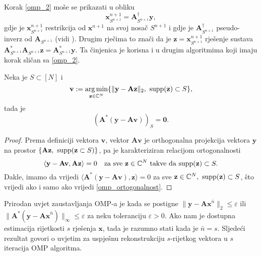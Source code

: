 \documentclass[a4paper,twoside,12pt]{memoir} %
\newcommand{\vect}[1]{\mathbf{#1}}
\renewcommand{\vec}{\vect}
\newcommand{\supp}{\text{\normalfont{supp}}}
\newcommand{\norm}[1]{\|{#1}\|}
\DeclareMathOperator*{\argmin}{arg\,min}
\begin{document}
Korak \eqref{omp_2} mo\v{s}e se prikazati u obliku
\begin{equation*}
    \vec{x}_{S^{n+1}}^{n+1} = \vec{A}_{S^{n+1}}^{\dagger}\vec y,
\end{equation*}
gdje je $\vec{x}_{S^{n+1}}^{n+1}$ restrikcija od $\vec x^{n+1}$ na svoj nosa\v{c} $S^{n+1}$ i gdje je $\vec A^{\dagger}_{S^{n+1}}$ pseudo-inverz od $\vec{A}_{S^{n+1}}$ (vidi \cite{penrose_1955}). Drugim rje\v{c}ima to zna\v{c}i da je $\vec z = \vec x ^{n+1}_{S^{n+1}}$ rje\v{s}enje sustava $\vec A^*_{S^{n+1}} \vec A_{S^{n+1}} \vec z = \vec A^*_{S^{n+1}} \vec y$. Ta \v{c}injenica je korisna i u drugim algoritmima koji imaju korak sli\v{c}an sa \eqref{omp_2}.
\begin{lem}\label{lem:3:4}
    Neka je $S \subset [N]$ i
    \begin{equation*}
        \vec v := \argmin_{\vec z \in \C^N} \{\norm{\vec y - \vec{Az}}_2,\ \supp(\vec z) \subset S\},
    \end{equation*}
    tada je
    \begin{equation}\label{omp_ortogonalnost}
        (\vec A^*(\vec y - \vec{Av}))_S = \vec 0.
    \end{equation}
\end{lem}
\begin{proof}
    Prema definiciji vektora $\vec v$, vektor $\vec{Av}$ je orthogonalna projekcija vektora $\vec y$ na prostor $\{\vec{Az},\ \supp(\vec{z} \subset S)\}$, pa je karakteriziran relacijom ortogonalnosti
    \begin{equation*}
        \langle \vec y - \vec{Av}, \vec{Az} \rangle = 0 \quad \text{za sve }\vec z \in \C^N \ \text{takve da } \supp(\vec z) \subset S.
    \end{equation*}
    Dakle, imamo da vrijedi $\langle \vec A^*( \vec y - \vec{Av}), \vec{z} \rangle = 0$ za sve $\vec z \in \C^N,\ \supp(\vec z) \subset S$, \v{s}to vrijedi ako i samo ako vrijedi \eqref{omp_ortogonalnost}.
\end{proof}

Prirodan uvjet zaustavljanja OMP-a je kada se postigne $\norm{\vec{y} - \vec{Ax}^{\bar{n}}}_2 \leq \varepsilon$ ili $\norm{\vec A^*(\vec y - \vec{Ax}^{\bar{n}})}_{\infty} \leq \varepsilon$ za neku toleranciju $\varepsilon > 0$. Ako nam je dostupna estimacija rijetkosti $s$ rje\v{s}enja $\vec x$, tada je razumno stati kada je $\bar{n} = s$. Sljede\'ci rezultat govori o uvjetim za uspje\v{s}nu rekonstrukciju $s$-rijetkog vektora u $s$ iteracija OMP algoritma.
\end{document}
